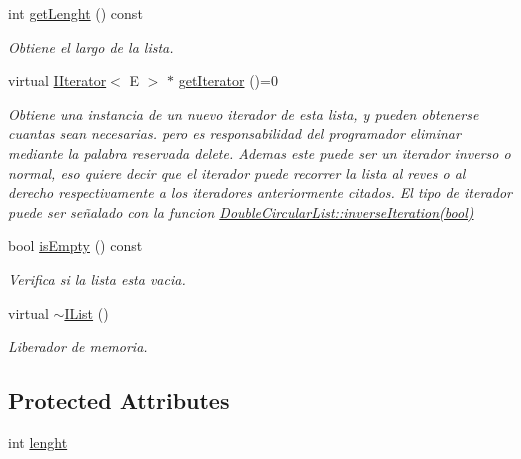 \begin{DoxyCompactItemize}
int \hyperlink{class_i_list_a6d43df225c304c3a0abdb4c7d81274b5}{get\-Lenght} () const 
\begin{DoxyCompactList}\small\item\em Obtiene el largo de la lista. \end{DoxyCompactList}\item 
virtual \hyperlink{class_i_iterator}{I\-Iterator}$<$ E $>$ $\ast$ \hyperlink{class_i_list_a997815664cc6b20eb5dfa9968251d2cd}{get\-Iterator} ()=0
\begin{DoxyCompactList}\small\item\em Obtiene una instancia de un nuevo iterador de esta lista, y pueden obtenerse cuantas sean necesarias. pero es responsabilidad del programador eliminar mediante la palabra reservada delete. Ademas este puede ser un iterador inverso o normal, eso quiere decir que el iterador puede recorrer la lista al reves o al derecho respectivamente a los iteradores anteriormente citados. El tipo de iterador puede ser señalado con la funcion \hyperlink{class_double_circular_list_a77212c5d6ad148c99a06009a8c44128b}{Double\-Circular\-List\-::inverse\-Iteration(bool)}\end{DoxyCompactList}\item 
bool \hyperlink{class_i_list_ad21f4969c574c87a4715d45496d81d5c}{is\-Empty} () const 
\begin{DoxyCompactList}\small\item\em Verifica si la lista esta vacia. \end{DoxyCompactList}\item 
\hypertarget{class_i_list_a6ff12f7e891ea75a5554b70ed3fa0de8}{virtual \hyperlink{class_i_list_a6ff12f7e891ea75a5554b70ed3fa0de8}{$\sim$\-I\-List} ()}\label{class_i_list_a6ff12f7e891ea75a5554b70ed3fa0de8}

\begin{DoxyCompactList}\small\item\em Liberador de memoria. \end{DoxyCompactList}\end{DoxyCompactItemize}
\subsection*{Protected Attributes}
\begin{DoxyCompactItemize}
\item 
int \hyperlink{class_i_list_a64ce981ba1104bbb482068983cb5a3bc}{lenght}
\end{DoxyCompactItemize}


